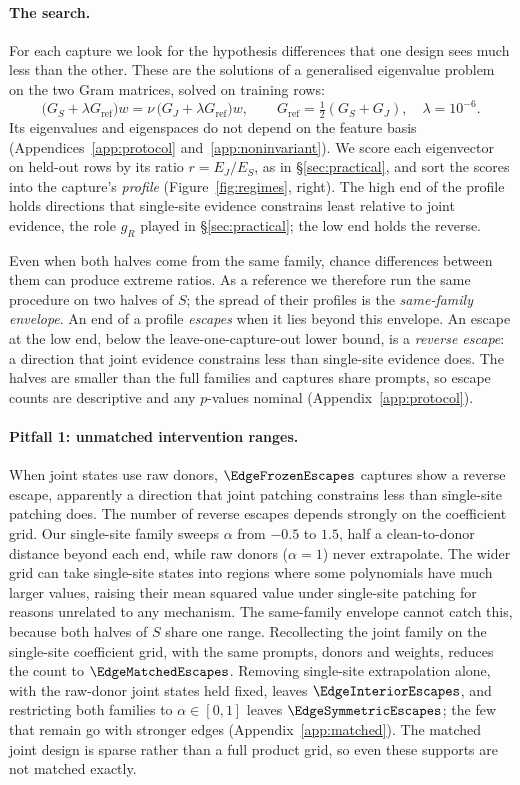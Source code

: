 \documentclass{article}
\theoremstyle{plain}
\theoremstyle{definition}
\begin{document}
\paragraph{The search.} For each capture we look for the hypothesis differences that one design sees much less than
the other. These are the solutions of a generalised eigenvalue problem on the two Gram matrices, solved on training
rows:
\[
  \bigl(G_S+\lambda G_{\mathrm{ref}}\bigr)w=\nu\,\bigl(G_J+\lambda G_{\mathrm{ref}}\bigr)w,\qquad
  G_{\mathrm{ref}}=\tfrac12(G_S+G_J),\quad\lambda=10^{-6}.
\]
Its eigenvalues and eigenspaces do not depend on the feature basis (Appendices~\ref{app:protocol}
and~\ref{app:noninvariant}). We score each eigenvector on held-out rows by its ratio $r=E_J/E_S$, as in
\S\ref{sec:practical}, and sort the scores into the capture's \emph{profile} (Figure~\ref{fig:regimes}, right). The
high end of the profile holds directions that single-site evidence constrains least relative to joint evidence, the role
$g_R$ played in \S\ref{sec:practical}; the low end holds the reverse.

Even when both halves come from the same family, chance differences between them can produce extreme ratios. As a
reference we therefore run the same procedure on two halves of $S$; the spread of their profiles is the \emph{same-family envelope}. An end of a
profile \emph{escapes} when it lies beyond this envelope. An escape at the low end, below the leave-one-capture-out
lower bound, is a \emph{reverse escape}: a direction that joint evidence constrains less than single-site evidence
does. The halves are smaller than the full families and captures share prompts, so escape counts are descriptive and
any $p$-values nominal (Appendix~\ref{app:protocol}).

\paragraph{Pitfall 1: unmatched intervention ranges.} When joint states use raw donors, $\EdgeFrozenEscapes$ captures show a reverse escape, apparently a direction that
joint patching constrains less than single-site patching does. The number of reverse escapes depends strongly on the coefficient grid. Our
single-site family sweeps $\alpha$ from $-0.5$ to $1.5$, half a clean-to-donor distance beyond each end, while raw donors
($\alpha=1$) never extrapolate. The wider grid can take single-site states into regions where some polynomials have much larger values, raising
their mean squared value under single-site patching for reasons unrelated to any mechanism. The same-family envelope
cannot catch this, because both halves of $S$ share one range. Recollecting the joint family on the single-site
coefficient grid, with the same prompts, donors and weights, reduces the count to $\EdgeMatchedEscapes$. Removing
single-site extrapolation alone, with the raw-donor joint states held fixed, leaves $\EdgeInteriorEscapes$, and
restricting both families to $\alpha\in[0,1]$ leaves $\EdgeSymmetricEscapes$; the few that remain go with stronger edges
(Appendix~\ref{app:matched}). The matched joint design is sparse rather than a full product grid, so even these
supports are not matched exactly.
\end{document}
